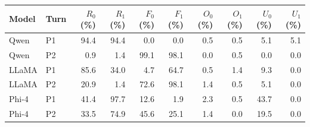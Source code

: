 \begin{tabular}{@{}llrrrrrrrr@{}}
\toprule
Model & Turn & $R_0$ (\%) & $R_1$ (\%) & $F_0$ (\%) & $F_1$ (\%) & $O_0$ (\%) & $O_1$ (\%) & $U_0$ (\%) & $U_1$ (\%) \\
\midrule
Qwen & P1 & 94.4 & 94.4 & 0.0 & 0.0 & 0.5 & 0.5 & 5.1 & 5.1 \\
Qwen & P2 & 0.9 & 1.4 & 99.1 & 98.1 & 0.0 & 0.5 & 0.0 & 0.0 \\
LLaMA & P1 & 85.6 & 34.0 & 4.7 & 64.7 & 0.5 & 1.4 & 9.3 & 0.0 \\
LLaMA & P2 & 20.9 & 1.4 & 72.6 & 98.1 & 1.4 & 0.5 & 5.1 & 0.0 \\
Phi-4 & P1 & 41.4 & 97.7 & 12.6 & 1.9 & 2.3 & 0.5 & 43.7 & 0.0 \\
Phi-4 & P2 & 33.5 & 74.9 & 45.6 & 25.1 & 1.4 & 0.0 & 19.5 & 0.0 \\
\bottomrule
\end{tabular}
